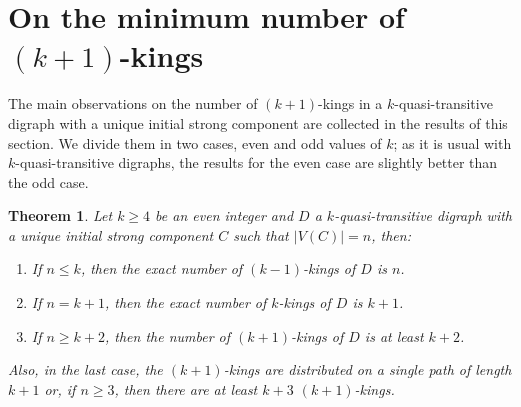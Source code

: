 \documentclass[preprint]{elsarticle}
\newtheorem{thm}{Theorem}[section]
\begin{document}
\section{On the minimum number of $(k+1)$-kings} \label{number}

The main observations on the number of $(k+1)$-kings in a $k$-quasi-transitive digraph with a unique initial strong component are collected in the results of this section.   We divide them in two cases, even and odd values of $k$; as it is usual with $k$-quasi-transitive digraphs, the results for the even case are slightly better than the odd case.

\begin{thm} \label{k+2-k+1}
Let $k \ge 4$ be an even integer and $D$ a $k$-quasi-transitive digraph with a unique initial strong component $C$ such that $|V(C)|=n$, then:
\begin{enumerate}
	\item If $n \le k$, then the exact number of $(k-1)$-kings of $D$ is $n$.
	
	\item If $n = k+1$, then the exact number of $k$-kings of $D$ is $k+1$.
	
	\item If $n \ge k+2$, then the number of $(k+1)$-kings of $D$ is at least $k+2$.
\end{enumerate}

\noindent
Also, in the last case, the $(k+1)$-kings are distributed on a single path of length $k+1$ or, if $n \ge 3$, then there are at least $k+3$ $(k+1)$-kings.
\end{thm}
\end{document}
